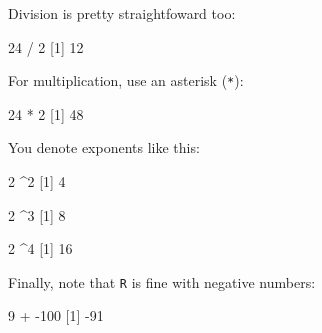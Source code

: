 \documentclass[
]{book}
\newenvironment{Shaded}{\begin{snugshade}}{\end{snugshade}}
\newcommand{\DecValTok}[1]{\textcolor[rgb]{0.00,0.00,0.81}{#1}}
\newcommand{\NormalTok}[1]{#1}
\newcommand{\SpecialCharTok}[1]{\textcolor[rgb]{0.00,0.00,0.00}{#1}}
\begin{document}
Division is pretty straightfoward too:

\begin{Shaded}
\begin{Highlighting}[]
\DecValTok{24} \SpecialCharTok{/} \DecValTok{2}
\NormalTok{[}\DecValTok{1}\NormalTok{] }\DecValTok{12}
\end{Highlighting}
\end{Shaded}

For multiplication, use an asterisk (\texttt{*}):

\begin{Shaded}
\begin{Highlighting}[]
\DecValTok{24} \SpecialCharTok{*} \DecValTok{2}
\NormalTok{[}\DecValTok{1}\NormalTok{] }\DecValTok{48}
\end{Highlighting}
\end{Shaded}

You denote exponents like this:

\begin{Shaded}
\begin{Highlighting}[]
\DecValTok{2} \SpecialCharTok{\^{}}\DecValTok{2}
\NormalTok{[}\DecValTok{1}\NormalTok{] }\DecValTok{4}
\end{Highlighting}
\end{Shaded}

\begin{Shaded}
\begin{Highlighting}[]
\DecValTok{2} \SpecialCharTok{\^{}}\DecValTok{3}
\NormalTok{[}\DecValTok{1}\NormalTok{] }\DecValTok{8}
\end{Highlighting}
\end{Shaded}

\begin{Shaded}
\begin{Highlighting}[]
\DecValTok{2} \SpecialCharTok{\^{}}\DecValTok{4}
\NormalTok{[}\DecValTok{1}\NormalTok{] }\DecValTok{16}
\end{Highlighting}
\end{Shaded}

Finally, note that \texttt{R} is fine with negative numbers:

\begin{Shaded}
\begin{Highlighting}[]
\DecValTok{9} \SpecialCharTok{+} \SpecialCharTok{{-}}\DecValTok{100}
\NormalTok{[}\DecValTok{1}\NormalTok{] }\SpecialCharTok{{-}}\DecValTok{91}
\end{Highlighting}
\end{Shaded}
\end{document}
